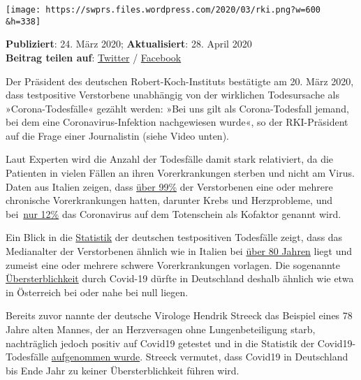 \texttt{[image: https://swprs.files.wordpress.com/2020/03/rki.png?w=600\\\&h=338]}

\textbf{Publiziert}: 24. März 2020; \textbf{Aktualisiert}: 28. April
2020\\
\textbf{Beitrag teilen auf}:
\href{https://twitter.com/intent/tweet?url=https://swprs.org/rki-relativiert-corona-todesfaelle/}{Twitter}
/
\href{https://www.facebook.com/share.php?u=https://swprs.org/rki-relativiert-corona-todesfaelle/}{Facebook}

Der Präsident des deutschen Robert-Koch-Instituts bestätigte am 20. März
2020, dass testpositive Verstorbene unabhängig von der wirklichen
Todesursache als »Corona-Todesfälle« gezählt werden: »Bei uns gilt als
Corona-Todesfall jemand, bei dem eine Coronavirus-Infektion nachgewiesen
wurde«, so der RKI-Präsident auf die Frage einer Journalistin (siehe
Video unten).

Laut Experten wird die Anzahl der Todesfälle damit stark relativiert, da
die Patienten in vielen Fällen an ihren Vorerkrankungen sterben und
nicht am Virus. Daten aus Italien zeigen, dass
\href{https://www.bloomberg.com/news/articles/2020-03-18/99-of-those-who-died-from-virus-had-other-illness-italy-says}{über
99\%} der Verstorbenen eine oder mehrere chronische Vorerkrankungen
hatten, darunter Krebs und Herzprobleme, und
bei~\href{https://www.telegraph.co.uk/news/2020/03/31/counting-coronavirus-different-countries-calculating-death-tolls/}{nur
12\%} das Coronavirus auf dem Totenschein als Kofaktor genannt wird.

Ein Blick in die
\href{https://de.wikipedia.org/wiki/COVID-19-Pandemie_in_Deutschland}{Statistik}
der deutschen testpositiven Todesfälle zeigt, dass das Medianalter der
Verstorbenen ähnlich wie in Italien bei
\href{https://www.tagesschau.de/newsticker/coronavirus-liveblog-105.html\#Grosse-regionale-Unterschiede-bei-Infektionen}{über
80 Jahren} liegt und zumeist eine oder mehrere schwere Vorerkrankungen
vorlagen. Die sogenannte
\href{https://www.euromomo.eu/index.html}{Übersterblichkeit} durch
Covid-19 dürfte in Deutschland deshalb ähnlich wie etwa in Österreich
bei oder nahe bei null liegen.

Bereits zuvor nannte der deutsche Virologe Hendrik Streeck das Beispiel
eines 78 Jahre alten Mannes, der an Herzversagen ohne Lungenbeteiligung
starb, nachträglich jedoch positiv auf Covid19 getestet und in die
Statistik der Covid19-Todesfälle
\href{https://www.faz.net/aktuell/gesellschaft/gesundheit/coronavirus/neue-corona-symptome-entdeckt-virologe-hendrik-streeck-zum-virus-16681450.html?printPagedArticle=true\#pageIndex_2}{aufgenommen
wurde}. Streeck vermutet, dass Covid19 in Deutschland bis Ende Jahr zu
keiner Übersterblichkeit führen wird.


